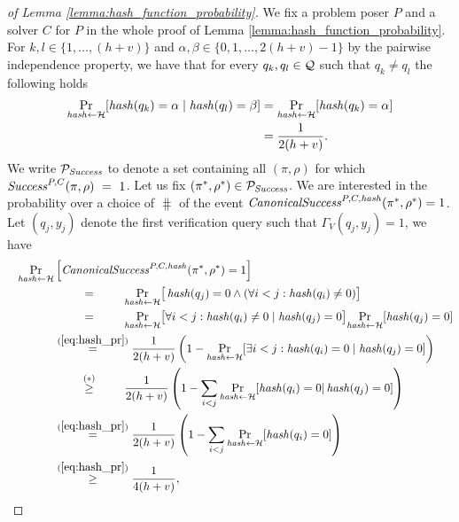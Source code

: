 \begin{proof}[of Lemma \ref{lemma:hash_function_probability}]
We fix a problem poser $P$ and a solver $C$ for $P$ in the whole proof of Lemma \ref{lemma:hash_function_probability}.
For $k,l \in \{1, \dotsc, (h+v)\}$ and $\alpha,\beta \in \{0,1,\dotsc,2(h+v)-1\}$ by the pairwise independence property,
we have that for every $q_k, q_l \in \mathcal{Q}$ such that $q_k \neq q_l$ the following holds
\begin{align}
 \label{eq:hash_pr}
 \underset{\operatorname{\mathit{hash}} \leftarrow \mathcal{H}}{\Pr}[\operatorname{\mathit{hash}}(q_k) = \alpha \mid \operatorname{\mathit{hash}}(q_l) = \beta] &=
 \underset{\operatorname{\mathit{hash}} \leftarrow \mathcal{H}}{\Pr}[\operatorname{\mathit{hash}}(q_k) = \alpha] \notag\\ &= \frac{1}{2(h+v)}.
\end{align}
%
We write $\mathcal{P}_{\operatorname{\mathit{Success}}}$ to denote a set containing all $(\pi,\rho)$ for which $\operatorname{\mathit{Success}}^{P, C}(\pi, \rho)~=~1$.
Let us fix $(\pi^*, \rho^*) \in \mathcal{P}_{\mathit{Success}}$. We are interested in the probability over
a choice of $\hash$ of the event $\operatorname{\mathit{CanonicalSuccess}}^{P,C,\operatorname{\mathit{hash}}}(\pi^*, \rho^*) = 1$.
Let $(q_j, y_j)$ denote the first verification query such that $\Gamma_V(q_j, y_j) = 1$, we have
\begin{align}
  \label{ineq:prob_hash_success}
  \underset{\hash \leftarrow \cH}{\Pr}&\left[\CanonicalSuccess^{P,C,\hash}(\pi^*, \rho^*) = 1\right] \notag\\
  \IndII &\overset{\hphantom{\eqref{eq:hash_pr}}}{=} \underset{\hash \leftarrow \cH}{\Pr}\big[\hash(q_j) = 0 \land (\forall i < j : \hash(q_i) \neq 0)\big] \notag\\
  \IndII &\overset{\hphantom{\eqref{eq:hash_pr}}}{=} \underset{\hash \leftarrow \cH}{\Pr}\big[
  \forall i < j : \hash(q_i) \neq 0 \mid \hash(q_j) = 0\big] \underset{\hash \leftarrow \cH}{\Pr}[\hash(q_j) = 0] \notag\\
  \IndII &\overset{(\ref{eq:hash_pr})}{=} \frac{1}{2(h+v)}\left(1 -\underset{\hash \leftarrow \cH}{\Pr}[\exists i < j : \hash(q_i) = 0 \mid \hash(q_j) = 0] \right) \notag\\
  \IndII &\stackrel{\substack{\hphantom{\eqref{eq:hash_pr}}\\(*)}}{\geq} \frac{1}{2(h+v)} \left( 1 - \sum_{i < j} \underset{\hash \leftarrow \cH}{\Pr}[\hash(q_i) = 0 | \hash(q_j) = 0] \right) \notag\\
  \IndII &\stackrel{(\ref{eq:hash_pr})}{=} \frac{1}{2(h+v)} \left( 1 -  \sum_{i < j}\underset{\hash \leftarrow \cH}{\Pr}[\hash(q_i) = 0] \right) \notag\\
  \IndII &\overset{(\ref{eq:hash_pr})}{\geq} \frac{1}{4(h+v)},

\end{align}
\end{proof}
